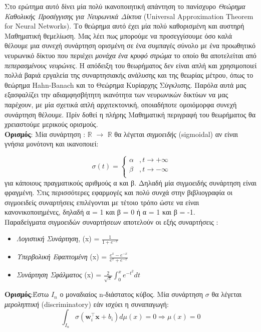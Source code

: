\documentclass[11pt]{article} %
\numberwithin{equation}{subsection}
\begin{document}
Στο ερώτημα αυτό δίνει μία πολύ ικανοποιητική απάντηση το πανίσχυρο \textit{Θεώρημα Καθολικής Προσέγγισης για Νευρωνικά Δίκτυα} (Universal Approximation Theorem for Neural Networks). Το θεώρημα αυτό έχει μία πολύ καθορισμένη και αυστηρή Μαθηματική θεμελίωση.  Μας λέει πως μπορούμε να προσεγγίσουμε όσο καλά θέλουμε μια συνεχή συνάρτηση ορισμένη σε ένα συμπαγές σύνολο με ένα προωθητικό νευρωνικό δίκτυο που περιέχει \textit{μονάχα ένα κρυφό στρώμα} το οποίο θα αποτελείται από \textit{πεπερασμένους νευρώνες}. Η απόδειξη του θεωρήματος δεν είναι απλή και χρησιμοποιεί πολλά βαριά εργαλεία της συναρτησιακής ανάλυσης και της θεωρίας μέτρου, όπως το θεώρημα Hahn-Banach και το Θεώρημα Κυρίαρχης Σύγκλισης. Παρόλα αυτά μας εξασφαλίζει την αδιαμφησβήτητη ικανότητα των νευρωνικών δικτύων να μας παρέχουν, με μία σχετικά απλή αρχιτεκτονική, οποιαδήποτε ομοιόμορφα συνεχή συνάρτηση θέλουμε. Πρίν δοθεί η πλήρης Μαθηματική περιγραφή του θεωρήματος θα χρειαστούμε μερικούς ορισμούς. \\ 

\textbf{Ορισμός}: Μία συνάρτηση \sigma : $\mathbb{R}$ $\rightarrow$ $\mathbb{R}$ θα λέγεται \textit{σιγμοειδής} (sigmoidal) αν είναι γνήσια μονότονη και ικανοποιεί: 

\[ 
\ \sigma(t) = \left\{
\begin{array}{ll}
      α & , t \rightarrow +\infty \\
      β & , t \rightarrow -\infty \\
\end{array} 
\right. 
\]
για κάποιους πραγματικούς αριθμούς α και β. Δηλαδή μία σιγμοειδής συνάρτηση είναι φραγμένη.  Στις περισσότερες εφαρμογές και πολύ συνχά στην βιβλιογραφία οι σιγμοειδείς συναρτήσεις επιλέγονται με τέτοιο τρόπο ώστε να είναι κανονικοποιημένες, δηλαδή α = 1 και β = 0 ή α = 1 και β = -1. \\

 Παραδείγματα σιγμοειδών συναρτήσεων αποτελούν οι εξής συναρτήσεις : \\
\begin{itemize}
  \item \textit{Λογιστική Συνάρτηση}, \sigma(x) = $\frac{1}{1 + e^{-x}}$ 
  \item \textit{Υπερβολική Εφαπτομένη} \sigma(x) = $\frac{e^x - e^{-x}}{e^x + e^{-x}}$
  \item \textit{Συνάρτηση Σφάλματος} \sigma(x) = $\displaystyle \frac{2}{\sqrt{\pi}} \int_{0}^{x} e^{-t^2} dt$
\end{itemize}


\textbf{Ορισμός}:Έστω $Ι_n$ ο μοναδιαίος n-διάστατος κύβος. Μία συνάρτηση $\sigma$ θα λέγεται \textit{μεροληπτική} (discriminatory) εάν ισχύει η συναπαγωγή: \\
\begin{equation}
 \displaystyle \int_{I_n} \sigma(\textbf{w}_i ^\intercal \mathbf{x} + b_i) d\mu(x) = 0 \Rightarrow \mu(x) = 0  
\end{equation} 
\end{document}

